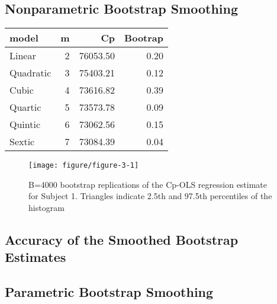 \documentclass[11pt,letter]{article}\usepackage[]{graphicx}\usepackage[]{color}
\makeatletter
\def\maxwidth{ %
  \ifdim\Gin@nat@width>\linewidth
    \linewidth
  \else
    \Gin@nat@width
  \fi
}
\newenvironment{knitrout}{}{} %
\makeatother
\begin{document}
\subsection{Nonparametric Bootstrap Smoothing}









\begin{table}[ht]
\centering
\begin{tabular}{lrrr}
  \hline
model & m & Cp & Bootrap \\ 
  \hline
Linear &   2 & 76053.50 & 0.20 \\ 
  Quadratic &   3 & 75403.21 & 0.12 \\ 
  Cubic &   4 & 73616.82 & 0.39 \\ 
  Quartic &   5 & 73573.78 & 0.09 \\ 
  Quintic &   6 & 73062.56 & 0.15 \\ 
  Sextic &   7 & 73084.39 & 0.04 \\ 
   \hline
\end{tabular}
\end{table}


\begin{knitrout}
\color{fgcolor}\begin{figure}

{\centering \texttt{[image: figure/figure-3-1]} 

}

\caption[B=4000 bootstrap replications of the Cp-OLS regression estimate for Subject 1]{B=4000 bootstrap replications of the Cp-OLS regression estimate for Subject 1. Triangles indicate 2.5th and 97.5th percentiles of the histogram}\label{fig:figure-3}
\end{figure}


\end{knitrout}



\subsection{Accuracy of the Smoothed Bootstrap Estimates}



\subsection{Parametric Bootstrap Smoothing}
\end{document}
